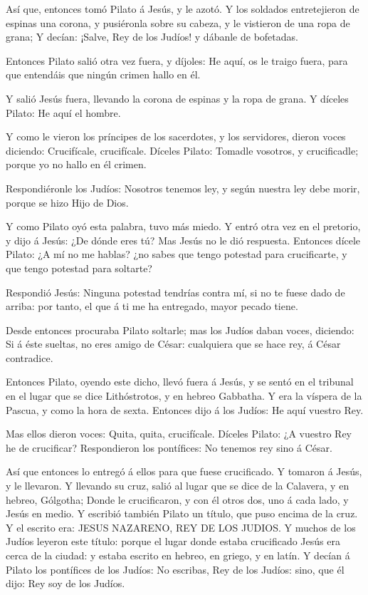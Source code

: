  Así que, entonces tomó Pilato á Jesús, y le azotó.
 Y los soldados entretejieron de espinas una corona, y
pusiéronla sobre su cabeza, y le vistieron de una ropa de grana;
 Y decían: ¡Salve, Rey de los Judíos! y dábanle de
bofetadas.

 Entonces Pilato salió otra vez fuera, y díjoles: He aquí,
os le traigo fuera, para que entendáis que ningún crimen hallo en él.

 Y salió Jesús fuera, llevando la corona de espinas y la
ropa de grana. Y díceles Pilato: He aquí el hombre.

 Y como le vieron los príncipes de los sacerdotes, y los
servidores, dieron voces diciendo: Crucifícale, crucifícale. Díceles
Pilato: Tomadle vosotros, y crucificadle; porque yo no hallo en él
crimen.

 Respondiéronle los Judíos: Nosotros tenemos ley, y según
nuestra ley debe morir, porque se hizo Hijo de Dios.

 Y como Pilato oyó esta palabra, tuvo más miedo.
 Y entró otra vez en el pretorio, y dijo á Jesús: ¿De dónde
eres tú? Mas Jesús no le dió respuesta.  Entonces dícele
Pilato: ¿A mí no me hablas? ¿no sabes que tengo potestad para
crucificarte, y que tengo potestad para soltarte?

 Respondió Jesús: Ninguna potestad tendrías contra mí, si
no te fuese dado de arriba: por tanto, el que á ti me ha entregado,
mayor pecado tiene.

 Desde entonces procuraba Pilato soltarle; mas los Judíos
daban voces, diciendo: Si á éste sueltas, no eres amigo de César:
cualquiera que se hace rey, á César contradice.

 Entonces Pilato, oyendo este dicho, llevó fuera á Jesús, y
se sentó en el tribunal en el lugar que se dice Lithóstrotos, y en
hebreo Gabbatha.  Y era la víspera de la Pascua, y como la
hora de sexta. Entonces dijo á los Judíos: He aquí vuestro Rey.

 Mas ellos dieron voces: Quita, quita, crucifícale. Díceles
Pilato: ¿A vuestro Rey he de crucificar? Respondieron los pontífices: No
tenemos rey sino á César.

 Así que entonces lo entregó á ellos para que fuese
crucificado. Y tomaron á Jesús, y le llevaron.  Y llevando
su cruz, salió al lugar que se dice de la Calavera, y en hebreo,
Gólgotha;  Donde le crucificaron, y con él otros dos, uno á
cada lado, y Jesús en medio.  Y escribió también Pilato un
título, que puso encima de la cruz. Y el escrito era: JESUS NAZARENO,
REY DE LOS JUDIOS.  Y muchos de los Judíos leyeron este
título: porque el lugar donde estaba crucificado Jesús era cerca de la
ciudad: y estaba escrito en hebreo, en griego, y en latín. 
Y decían á Pilato los pontífices de los Judíos: No escribas, Rey de los
Judíos: sino, que él dijo: Rey soy de los Judíos.

